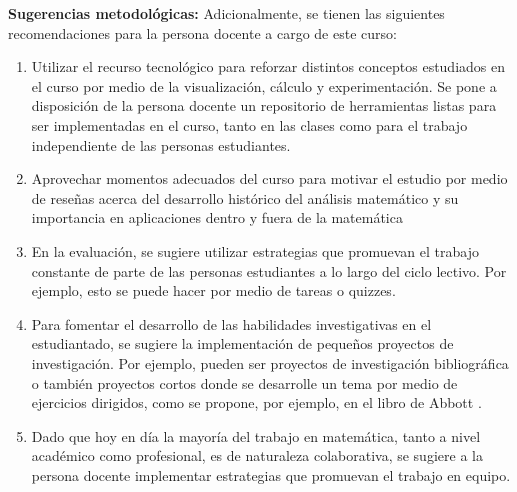 \begin{refsection}
\textbf{Sugerencias metodológicas:} Adicionalmente, se tienen las siguientes recomendaciones para la persona docente a cargo de este curso:
\begin{enumerate}
    \item Utilizar el recurso tecnológico para reforzar distintos conceptos estudiados en el curso por medio de la visualización, cálculo y experimentación. Se pone a disposición de la persona docente un repositorio de herramientas listas para ser implementadas en el curso, tanto en las clases como para el trabajo independiente de las personas estudiantes.
    \item Aprovechar momentos adecuados del curso para motivar el estudio por medio de reseñas acerca del desarrollo histórico del análisis matemático y su importancia en aplicaciones dentro y fuera de la matemática
    \item En la evaluación, se sugiere utilizar estrategias que promuevan el trabajo constante de parte de las personas estudiantes a lo largo del ciclo lectivo. Por ejemplo, esto se puede hacer por medio de tareas o quizzes.
    \item Para fomentar el desarrollo de las habilidades investigativas en el estudiantado, se sugiere la implementación de pequeños proyectos de investigación. Por ejemplo, pueden ser proyectos de investigación bibliográfica o también proyectos cortos donde se desarrolle un tema por medio de ejercicios dirigidos, como se propone, por ejemplo, en el libro de Abbott \cite{Abb15}.
    \item Dado que hoy en día la mayoría del trabajo en matemática, tanto a nivel académico como profesional, es de naturaleza colaborativa, se sugiere a la persona docente implementar estrategias que promuevan el trabajo en equipo.
\end{enumerate}




\nocite{Abb15}
\nocite{Apo84}
\nocite{Apo85} 
\nocite{Bar76}
\nocite{BS11}
\nocite{Apo76}
\nocite{Spi08}
\nocite{Ros13}
\nocite{TBB08}
\nocite{Rud76}
\nocite{Piz06}
\nocite{How01}

\printbibliography[heading=subbibliography]
\end{refsection}
